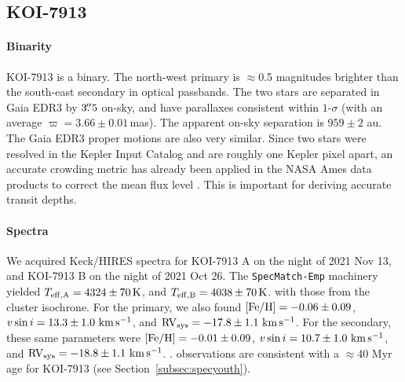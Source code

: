 \documentclass[12pt,twocolumn,tighten,linenumbers]{aastex63}
\newcommand{\mkms}{{\rm \,km\,s^{-1}}}  %
\begin{document}
\subsection{KOI-7913}
\label{subsec:koi7913}

\paragraph{Binarity}
KOI-7913 is a binary.  The north-west primary is
$\approx$0.5 magnitudes brighter than the south-east secondary in
optical passbands.  The two stars are separated in Gaia EDR3 by
$3\mbox{$.\!\!^{\prime\prime}$}5$ on-sky, and have parallaxes consistent within $1$-$\sigma$
(with an average $\varpi=3.66 \pm 0.01$\,mas).  The apparent on-sky
separation is $959 \pm 2$ au.  The Gaia EDR3 proper motions are also
very similar.  Since two stars were resolved in the Kepler Input
Catalog and are roughly one Kepler pixel apart, an accurate crowding
metric has already been applied in the NASA Ames data products to
correct the mean flux level \citep{2017ksci.rept....6M}.  This is
important for deriving accurate transit depths.

\paragraph{Spectra}
We acquired Keck/HIRES spectra for KOI-7913 A on the night of 2021 Nov
13, and KOI-7913 B on the night of 2021 Oct 26.  The
\texttt{SpecMatch-Emp} machinery yielded $T_{\rm eff,A} = 4324 \pm
70\,{\rm K}$, and $T_{\rm eff,B} = 4038 \pm 70\,{\rm K}$.   with those from the cluster
isochrone.  For the primary, we also found $[{\rm Fe/H}]= -0.06 \pm
0.09$, $v\sin i = 13.3 \pm 1.0\,\mkms$, and ${\rm RV}_{\rm sys} =
-17.8 \pm 1.1\,\mkms$.  For the secondary, these same parameters were
$[{\rm Fe/H}]= -0.01 \pm 0.09$, $v\sin i = 10.7 \pm 1.0\,\mkms$, and
${\rm RV}_{\rm sys} = -18.8 \pm 1.1\,\mkms$.  .   observations
are consistent with a $\approx$40 Myr age for KOI-7913 (see
Section~\ref{subsec:specyouth}).
\end{document}
